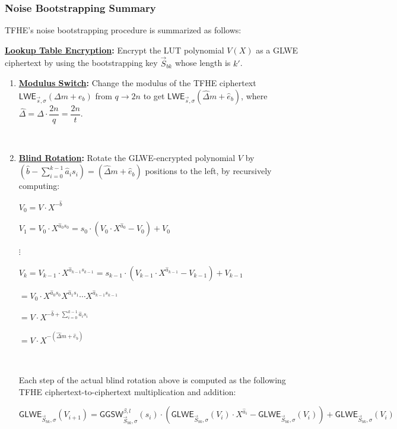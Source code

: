 \subsubsection{Noise Bootstrapping Summary}
\label{subsec:tfhe-summary}

TFHE's noise bootstrapping procedure is summarized as follows:

\begin{tcolorbox}[title={\textbf{\tboxlabel{\ref*{subsec:tfhe-summary}} TFHE Noise Bootstrapping Procedure}}]

\textbf{\underline{Lookup Table Encryption}:} Encrypt the LUT polynomial $V(X)$ as a GLWE ciphertext by using the bootstrapping key $\vec{S}_{bk}$ whose length is $k'$. 

  
\begin{enumerate}
\item \textbf{\underline{Modulus Switch}:} Change the modulus of the TFHE ciphertext $\textsf{LWE}_{\vec{s}, \sigma}(\Delta m + e_b)$ from $q \rightarrow 2n$ to get $\textsf{LWE}_{\vec{s}, \sigma}(\hat{\Delta} m + \hat e_b)$, where $\hat\Delta = \Delta \cdot \dfrac{2n}{q} = \dfrac{2n}{t}$.

$ $

\item \textbf{\underline{Blind Rotation}:} Rotate the GLWE-encrypted polynomial $V$ by $(\hat{b} - \sum\limits_{i=0}^{k-1}{\hat{a}_is_i}) = (\hat{\Delta}m + \hat{e}_b)$ positions to the left, by recursively computing: 

$V_0 = V \cdot X^{-\hat{b}}$

$V_1 = V_0 \cdot X^{\hat{a}_0s_0} = s_0 \cdot (V_0 \cdot X^{\hat{a}_0} - V_0) + V_0$

\text{ } $\vdots$

$V_k = V_{k-1} \cdot X^{\hat{a}_{k-1}s_{k-1}} = s_{k-1} \cdot (V_{k-1} \cdot X^{\hat{a}_{k-1}} - V_{k-1}) + V_{k-1}$

$= V_0 \cdot X^{\hat{a}_0s_0}X^{\hat{a}_1s_1}\cdots X^{\hat{a}_{k-1}s_{k-1}}$

$= V \cdot X^{- \hat{b} + \sum_{i=0}^{k-1}{\hat{a}_is_i}} $

$ = V \cdot X^{-(\hat{\Delta}m + \hat{e}_b)}$

$ $

\noindent Each step of the actual blind rotation above is computed as the following TFHE ciphertext-to-ciphertext multiplication and addition:

$\textsf{GLWE}_{\vec{S}_{bk}, \sigma}(V_{i+1}) = \textsf{GGSW}_{\vec{S}_{bk}, \sigma}^{\beta, l}(s_i) \cdot (\textsf{GLWE}_{\vec{S}_{bk}, \sigma}(V_i) \cdot X^{\hat{a}_i} - \textsf{GLWE}_{\vec{S}_{bk}, \sigma}(V_i)) + \textsf{GLWE}_{\vec{S}_{bk}, \sigma}(V_i)$


\end{enumerate}
\end{tcolorbox}
